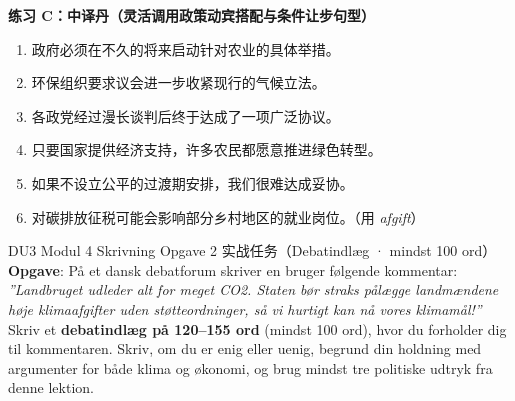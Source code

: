 \textbf{练习 C：中译丹（灵活调用政策动宾搭配与条件让步句型）}
\begin{enumerate}
  \item 政府必须在不久的将来启动针对农业的具体举措。
  \item 环保组织要求议会进一步收紧现行的气候立法。
  \item 各政党经过漫长谈判后终于达成了一项广泛协议。
  \item 只要国家提供经济支持，许多农民都愿意推进绿色转型。
  \item 如果不设立公平的过渡期安排，我们很难达成妥协。
  \item 对碳排放征税可能会影响部分乡村地区的就业岗位。（用 \textit{afgift}）
\end{enumerate}


\begin{emailbox}{DU3 Modul 4 Skrivning Opgave 2 实战任务（Debatindlæg · mindst 100 ord）}
\textbf{Opgave}: På et dansk debatforum skriver en bruger følgende kommentar:\newline
\textit{”Landbruget udleder alt for meget CO2. Staten bør straks pålægge landmændene høje klimaafgifter uden støtteordninger, så vi hurtigt kan nå vores klimamål!”}\\[3pt]
Skriv et \textbf{debatindlæg på 120--155 ord} (mindst 100 ord), hvor du forholder dig til kommentaren. Skriv, om du er enig eller uenig, begrund din holdning med argumenter for både klima og økonomi, og brug mindst tre politiske udtryk fra denne lektion.
\end{emailbox}

